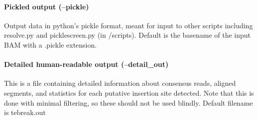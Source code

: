 \documentclass[letterpaper,11pt]{article}
\begin{document}
\paragraph{Pickled output (--pickle)}
Output data in python's pickle format, meant for input to other scripts including resolve.py and picklescreen.py (in /scripts). Default is the basename of the input BAM with a .pickle extension.

\paragraph{Detailed human-readable output (--detail\_out)}
This is a file containing detailed information about consensus reads, aligned segments, and statistics for each putative insertion site detected. Note that this is done with minimal filtering, so these should not be used blindly. Default filename is tebreak.out
\end{document}
